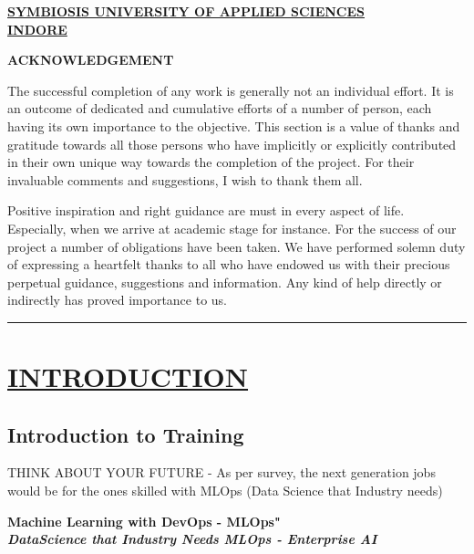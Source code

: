 \documentclass[12pt,oneside,a4paper]{report}
\begin{document}
\newpage 
\begin{large}
\begin{center}
\fontsize{18pt}{10pt}\selectfont
\underline{\textbf{SYMBIOSIS UNIVERSITY OF APPLIED SCIENCES}}\\
\vspace{5.0mm}\underline{\textbf{INDORE}}
\end{center}
\end{large}
\vspace{0.5in}
\begin{large}
\begin{center}
\fontsize{16pt}{10pt}\selectfont
\textbf{ACKNOWLEDGEMENT}
\end{center}
\end{large}
\vspace{0.4in}
The successful completion of any work is generally not an individual effort. It is an
outcome of dedicated and cumulative efforts of a number of person, each having its own
importance to the objective. This section is a value of thanks and gratitude towards all those
persons who have implicitly or explicitly contributed in their own unique way towards the
completion of the project. For their invaluable comments and suggestions, I wish to thank them
all.

\begin{flushleft}
Positive inspiration and right guidance are must in every aspect of life. Especially, when
we arrive at academic stage for instance. For the success of our project a number of obligations
have been taken. We have performed solemn duty of expressing a heartfelt thanks to all who have
endowed us with their precious perpetual guidance, suggestions and information. Any kind of help
directly or indirectly has proved importance to us.
\end{flushleft}\vspace{1.0in}
\begin{flushright}
\rule{150pt}{1pt}
\end{flushright}

\tableofcontents
\chapter{\underline{{INTRODUCTION}}}
\section{Introduction to Training}
THINK ABOUT YOUR FUTURE - As per survey, the next generation jobs would be for the ones skilled with MLOps (Data Science that Industry needs)\\
\begin{center}
\textbf{\Large{Machine Learning with DevOps - MLOps"}}\\
\textbf{\textit{\large{DataScience that Industry Needs MLOps - Enterprise AI}}}
\end{center}
\end{document}
